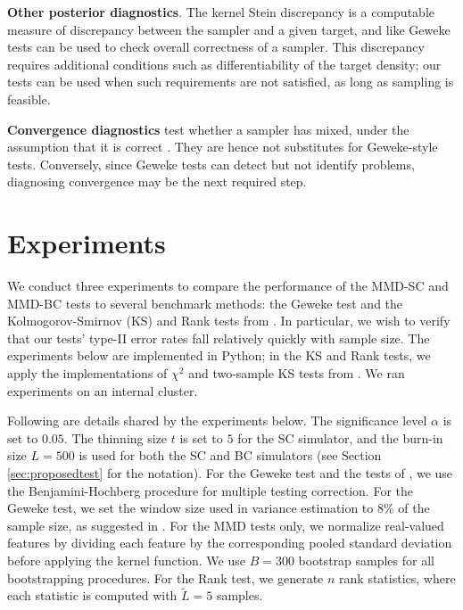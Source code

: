 \documentclass{article}
\begin{document}
{\noindent\bf Other posterior diagnostics}.
The kernel Stein discrepancy \citep{Chwialkowski2016, Gorham2017, liu_kernelized_2016} is a computable measure of discrepancy between the sampler and a given target, and like Geweke tests can be used to check overall correctness of a sampler. 
This discrepancy requires additional conditions such as differentiability of the target density; our tests can be used when such requirements are not satisfied, as long as sampling is feasible.

{\noindent\bf Convergence diagnostics} test whether a sampler has mixed, under the assumption that it is correct \citep[e.g.][]{robert_short_2011}. They are hence not substitutes for Geweke-style tests. Conversely, since Geweke tests can detect but not identify problems, diagnosing convergence may be the next required step. 


\section{Experiments}\label{sec:experiments}
We conduct three experiments to compare the performance of the MMD-SC and MMD-BC tests to several benchmark methods: the Geweke test and the Kolmogorov-Smirnov (KS) and Rank tests from \cite{gandy_unit_2020}. 
In particular, we wish to verify that our tests' type-II error rates fall relatively quickly with sample size. 
The experiments below are implemented in Python; in the KS and Rank tests, we apply the implementations of $\chi^{2}$ and two-sample KS tests from \cite{2020SciPy-NMeth}.
We ran experiments on an internal cluster.

Following are details shared by the experiments below.
The significance level $\alpha$ is set to $0.05.$
The thinning size $t$ is set to $5$ for the SC simulator, and the burn-in size $L=500$ is used for both the SC and BC simulators (see Section \ref{sec:proposedtest} for the notation). 
For the Geweke test and the tests of \cite{gandy_unit_2020}, 
we use the Benjamini-Hochberg procedure \citep{benjamini_controlling_1995} for multiple testing correction. 
For the Geweke test, we set the window size used in variance estimation to $8\%$ of the sample size, as suggested in \cite{geweke_using_1999}.
For the MMD tests only,
we normalize real-valued features by dividing each feature by the corresponding pooled standard deviation before applying the kernel function. We use $B=300$ bootstrap samples for all bootstrapping procedures. 
For the Rank test, we generate $n$ rank statistics, where each statistic is computed with $\tilde{L}=5$ samples.
\end{document}

